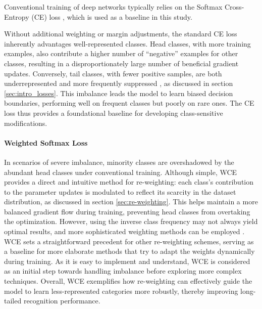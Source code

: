 Conventional training of deep networks typically relies on the Softmax Cross-Entropy (CE) loss \cite{zhang2023deep}, which is used as a baseline in this study. 

Without additional weighting or margin adjustments, the standard CE loss inherently advantages well-represented classes. Head classes, with more training examples, also contribute a higher number of “negative” examples for other classes, resulting in a disproportionately large number of beneficial gradient updates. Conversely, tail classes, with fewer positive samples, are both underrepresented and more frequently suppressed \cite{zhang2023deep, lin2018focallossdenseobject}, as discussed in section \ref{sec:intro_losses}. This imbalance leads the model to learn biased decision boundaries, performing well on frequent classes but poorly on rare ones. The CE loss thus provides a foundational baseline for developing class-sensitive modifications. 


\paragraph{Weighted Softmax Loss}
In scenarios of severe imbalance, minority classes are overshadowed by the abundant head classes under conventional training. Although simple, WCE provides a direct and intuitive method for re-weighting: each class’s contribution to the parameter updates is modulated to reflect its scarcity in the dataset distribution, as discussed in section \ref{sec:re-weighting}. This helps maintain a more balanced gradient flow during training, preventing head classes from overtaking the optimization. However, using the inverse class frequency may not always yield optimal results, and more sophisticated weighting methods can be employed \cite{zhang2023deep}. WCE sets a straightforward precedent for other re-weighting schemes, serving as a baseline for more elaborate methods that try to adapt the weights dynamically during training. As it is easy to implement and understand, WCE is considered as an initial step towards handling imbalance before exploring more complex techniques. Overall, WCE exemplifies how re-weighting can effectively guide the model to learn less-represented categories more robustly, thereby improving long-tailed recognition performance.

